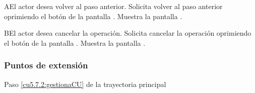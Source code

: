  
 \begin{UCtrayectoriaA}{A}{El actor desea volver al paso anterior.}
     \UCpaso[\UCactor] Solicita volver al paso anterior oprimiendo el botón  de la pantalla .
    \UCpaso[\UCsist] Muestra la pantalla .
 \end{UCtrayectoriaA}
 

 \begin{UCtrayectoriaA}{B}{El actor desea cancelar la operación.}
    \UCpaso[\UCactor] Solicita cancelar la operación oprimiendo el botón  de la pantalla .
    \UCpaso[\UCsist] Muestra la pantalla .
 \end{UCtrayectoriaA}
 

\subsubsection{Puntos de extensión}

	{Paso \ref{cu5.7.2:gestionaCU} de la trayectoria principal}
	{}

	
